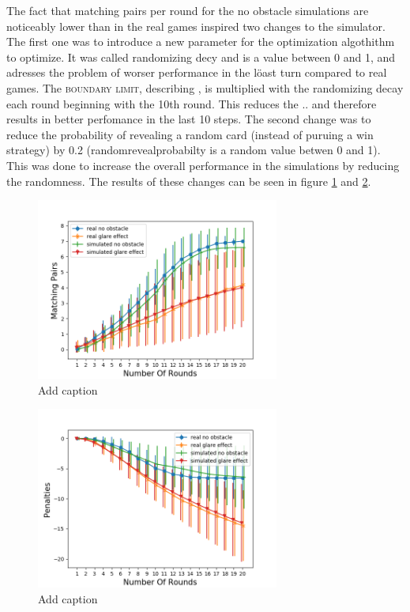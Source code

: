 The fact that matching pairs per round for the no obstacle simulations are noticeably lower than in the real games inspired two changes to the simulator. The first one was to introduce a new parameter for the optimization algothithm to optimize. It was called randomizing decy and is a value between 0 and 1, and adresses the problem of worser performance in the löast turn compared to real games. The \textsc{boundary limit}, describing , is multiplied with the randomizing decay each round beginning with the 10th round. This reduces the .. and therefore results in better perfomance in the last 10 steps. The second change was to reduce the probability of revealing a random card (instead of puruing a win strategy) by 0.2 (randomrevealprobabilty is a random value betwen 0 and 1). This was done to increase the overall performance in the simulations by reducing the randomness. The results of these changes can be seen in figure \ref{fig:simOp1} and \ref{fig:simOp2}. 

\begin{minipage}{0.5\textwidth}
	\begin{figure}[H]
		\centering
		\includegraphics[width=8cm]{images/simulationOptimized1.png}
		\caption[Bild kurz]{Add caption}
		\label{fig:simOp1}
	\end{figure}
\end{minipage}
\begin{minipage}{0.5\textwidth}
	\begin{figure}[H]
		\centering
		\includegraphics[width=8cm]{images/simulationOptimized2.png}
		\caption[Bild kurz]{Add caption}
		\label{fig:simOp2}
	\end{figure}
\end{minipage} 

